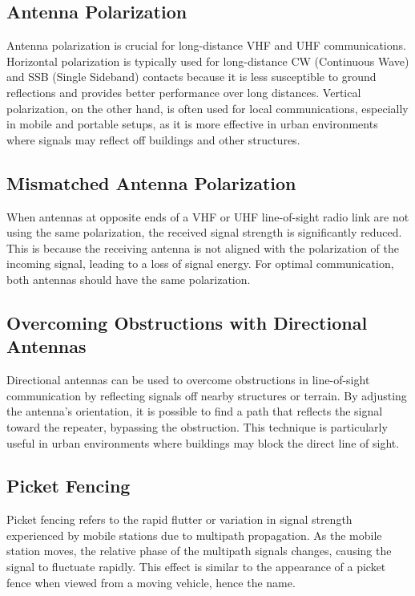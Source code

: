 \subsection*{Antenna Polarization}
Antenna polarization is crucial for long-distance VHF and UHF communications. Horizontal polarization is typically used for long-distance CW (Continuous Wave) and SSB (Single Sideband) contacts because it is less susceptible to ground reflections and provides better performance over long distances. Vertical polarization, on the other hand, is often used for local communications, especially in mobile and portable setups, as it is more effective in urban environments where signals may reflect off buildings and other structures.

\subsection*{Mismatched Antenna Polarization}
When antennas at opposite ends of a VHF or UHF line-of-sight radio link are not using the same polarization, the received signal strength is significantly reduced. This is because the receiving antenna is not aligned with the polarization of the incoming signal, leading to a loss of signal energy. For optimal communication, both antennas should have the same polarization.

\subsection*{Overcoming Obstructions with Directional Antennas}
Directional antennas can be used to overcome obstructions in line-of-sight communication by reflecting signals off nearby structures or terrain. By adjusting the antenna's orientation, it is possible to find a path that reflects the signal toward the repeater, bypassing the obstruction. This technique is particularly useful in urban environments where buildings may block the direct line of sight.

\subsection*{Picket Fencing}
Picket fencing refers to the rapid flutter or variation in signal strength experienced by mobile stations due to multipath propagation. As the mobile station moves, the relative phase of the multipath signals changes, causing the signal to fluctuate rapidly. This effect is similar to the appearance of a picket fence when viewed from a moving vehicle, hence the name.

